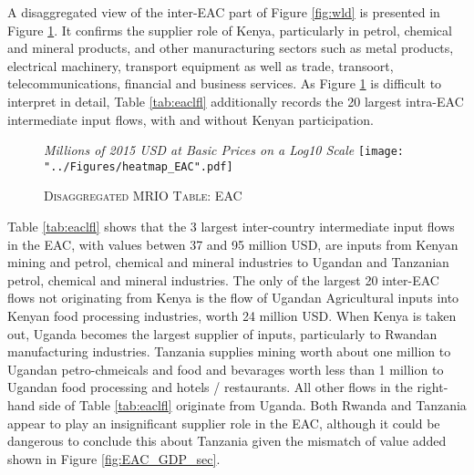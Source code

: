 \documentclass[a4paper]{article}
\begin{document}
A disaggregated view of the inter-EAC part of Figure \ref{fig:wld} is presented in Figure \ref{fig:eac}. It confirms the supplier role of Kenya, particularly in petrol, chemical and mineral products, and other manuracturing sectors such as metal products, electrical machinery, transport equipment as well as trade, transoort, telecommunications, financial and business services. As Figure \ref{fig:eac} is difficult to interpret in detail, Table \ref{tab:eaclfl} additionally records the 20 largest intra-EAC intermediate input flows, with and without Kenyan participation.

\begin{figure}[h!]
\centering
\caption{\label{fig:eac}\textsc{Disaggregated MRIO Table: EAC}}
\small{\textit{Millions of 2015 USD at Basic Prices on a Log10 Scale}}
\texttt{[image: "../Figures/heatmap\_EAC".pdf]} %
\end{figure}
\FloatBarrier

Table \ref{tab:eaclfl} shows that the 3 largest inter-country intermediate input flows in the EAC, with values betwen 37 and 95 million USD, are inputs from Kenyan mining and petrol, chemical and mineral industries to Ugandan and Tanzanian petrol, chemical and mineral industries. The only of the largest 20 inter-EAC flows not originating from Kenya  is the flow of Ugandan Agricultural inputs into Kenyan food processing industries, worth 24 million USD. When Kenya is taken out, Uganda becomes the largest supplier of inputs, particularly to Rwandan manufacturing industries. Tanzania supplies mining worth about one million to Ugandan petro-chmeicals and food and bevarages worth less than 1 million to Ugandan food processing and hotels / restaurants. All other flows in the right-hand side of Table \ref{tab:eaclfl} originate from Uganda. Both Rwanda and Tanzania appear to play an insignificant supplier role in the EAC, although it could be dangerous to conclude this about Tanzania given the mismatch of value added shown in Figure \ref{fig:EAC_GDP_sec}. 
\end{document}
